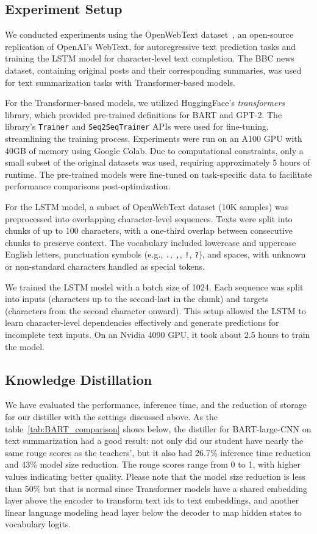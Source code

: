 \subsection{Experiment Setup}
We conducted experiments using the OpenWebText dataset~\cite{gokaslan2019openwebtext}, an open-source replication of OpenAI's WebText,
for autoregressive text prediction tasks and training the LSTM model for character-level text completion.
The BBC news dataset, containing original posts and their corresponding summaries,
was used for text summarization tasks with Transformer-based models.

For the Transformer-based models, we utilized HuggingFace's \textit{transformers}~\cite{wolf2020transformers} library,
which provided pre-trained definitions for BART and GPT-2.
The library's \texttt{Trainer} and \texttt{Seq2SeqTrainer} APIs were used for fine-tuning, streamlining the training process.
Experiments were run on an A100 GPU with 40GB of memory using Google Colab.
Due to computational constraints, only a small subset of the original datasets was used,
requiring approximately 5 hours of runtime.
The pre-trained models were fine-tuned on task-specific data to facilitate performance comparisons post-optimization.

For the LSTM model, a subset of OpenWebText dataset (10K samples) was preprocessed into overlapping character-level sequences.
Texts were split into chunks of up to 100 characters, with a one-third overlap between consecutive chunks to preserve context.
The vocabulary included lowercase and uppercase English letters, punctuation symbols (e.g., \texttt{.}, \texttt{,}, \texttt{!}, \texttt{?}),
and spaces, with unknown or non-standard characters handled as special tokens.

We trained the LSTM model with a batch size of 1024.
Each sequence was split into inputs (characters up to the second-last in the chunk) and targets (characters from the second character onward).
This setup allowed the LSTM to learn character-level dependencies effectively and generate predictions for incomplete text inputs.
On an Nvidia 4090 GPU, it took about 2.5 hours to train the model.

\subsection{Knowledge Distillation}
We have evaluated the performance, inference time, and the reduction of storage for our distiller with the settings discussed above. As the table~\ref{tab:BART_comparison} shows below, the distiller for BART-large-CNN on text summarization had a good result: not only did our student have nearly the same rouge scores as the teachers', but it also had 26.7\% inference time reduction and 43\% model size reduction. The rouge scores range from 0 to 1, with higher values indicating better quality. Please note that the model size reduction is less than 50\% but that is normal since Transformer models have a shared embedding layer above the encoder to transform text ids to text embeddings,  %
and another linear language modeling head layer below the decoder to map hidden states to vocabulary logits. %


